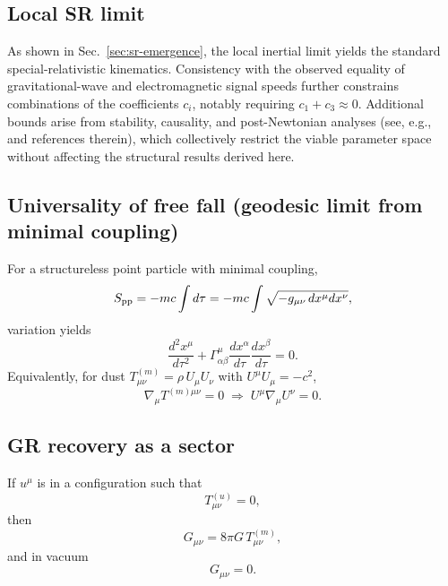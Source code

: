 \documentclass[11pt]{article}
\begin{document}
        \subsection{Local SR limit}
            As shown in Sec.~\ref{sec:sr-emergence}, the local inertial limit yields the
            standard special-relativistic kinematics.
            Consistency with the observed equality of gravitational-wave and electromagnetic
            signal speeds further constrains combinations of the coefficients $c_i$, notably
            requiring $c_1 + c_3 \approx 0$.
            Additional bounds arise from stability, causality, and post-Newtonian analyses
            (see, e.g.,~\cite{jacobson2008} and references therein),
            which collectively restrict the viable parameter space without affecting the
            structural results derived here.

        \subsection{Universality of free fall (geodesic limit from minimal coupling)}
            For a structureless point particle with minimal coupling,
            \begin{equation}
                S_{\rm pp} = -mc\int d\tau
                = -mc\int \sqrt{-g_{\mu\nu}\,dx^\mu dx^\nu},
            \end{equation}
            variation yields
            \begin{equation}
                \frac{d^2 x^\mu}{d\tau^2} + \Gamma^\mu_{\alpha\beta}\frac{dx^\alpha}{d\tau}\frac{dx^\beta}{d\tau}=0.
            \end{equation}
            Equivalently, for dust $T^{(m)}_{\mu\nu}=\rho\,U_\mu U_\nu$ with $U^\mu U_\mu=-c^2$,
            \begin{equation}
                \nabla_\mu T^{(m)\mu\nu}=0
                \;\Rightarrow\;
                U^\mu \nabla_\mu U^\nu = 0.
            \end{equation}

        \subsection{GR recovery as a sector}
            If $u^\mu$ is in a configuration such that
            \begin{equation}
                T^{(u)}_{\mu\nu}=0,
            \end{equation}
            then
            \begin{equation}
                G_{\mu\nu}=8\pi G\,T^{(m)}_{\mu\nu},
            \end{equation}
            and in vacuum
            \begin{equation}
                G_{\mu\nu}=0.
            \end{equation}
\end{document}
